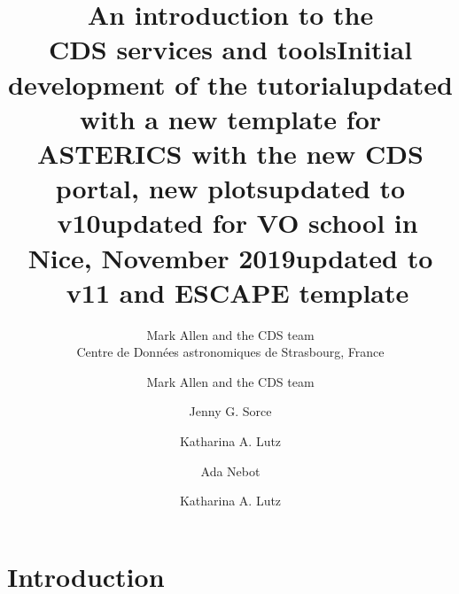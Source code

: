 \documentclass [a4paper, 12pt]{article}
\begin{document}
\author{Mark Allen and the CDS team \\      %
Centre de Donn\'ees astronomiques de Strasbourg, France}       %
\title{An introduction to the \\ CDS services and tools}   %
\makeescapetitle

\newpage
\author{Mark Allen and the CDS team}   %
\title{Initial development of the tutorial}  %
\addescapehistory
\author{Jenny G. Sorce}
\title{updated with a new template for ASTERICS with the new CDS portal, new plots}
\addescapehistory
\author{Katharina A. Lutz}
\title{updated to \aladin\ v10}
\addescapehistory
\author{Ada Nebot}
\title{updated for VO school in Nice, November 2019}
\addescapehistory
\author{Katharina A. Lutz}
\title{updated to \aladin\ v11 and ESCAPE template}
\addescapehistory
\newpage
\tableofcontents

\newpage
\section{Introduction}
\end{document}
